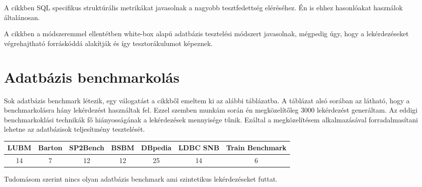 A \cite{SuarezCabal} cikkben SQL specifikus struktúrális metrikákat javasolnak a nagyobb tesztfedettség eléréséhez. Én is ehhez hasonlóakat használok általánosan.

A \cite{DBLP} cikkben a módszeremmel ellentétben white-box alapú adatbázis tesztelési módszert javasolnak, mégpedig úgy, hogy a lekérdezéseket végrehajtható forráskóddá alakítják és így tesztorákulumot képeznek.



\section{Adatbázis benchmarkolás}
Sok adatbázis benchmark létezik, egy válogatást a \cite{szarnyas2018train} cikkből emeltem ki az alábbi táblázatba. A táblázat alsó sorában az látható, hogy a benchmarkolásra hány lekérdezést használtak fel. Ezzel szemben munkám során én megközelítőleg 3000 lekérdezést generáltam. Az eddigi benchmarkoklási technikák fő hiányosságának a lekérdezések mennyisége tűnik.  Ezáltal a megközelítésem alkalmazásával forradalmasítani lehetne az adatbázisok teljesítmény tesztelését. 

\begin{center}
	\begin{tabular}{ c | c | c | c | c | c | c }
 LUBM & Barton & SP2Bench & 	BSBM & DBpedia & LDBC SNB &	Train Benchmark \\\hline
 14 & 7 & 12 & 12 &	25 & 14 & 	6 \\
	\end{tabular}
\end{center}

\noindent
Tudomásom szerint nincs olyan adatbázis benchmark ami szintetikus lekérdezéseket futtat.